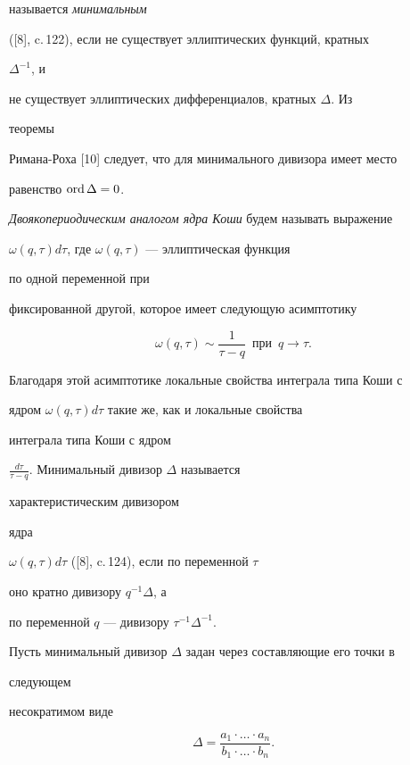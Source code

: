 называется {\it минимальным} 


([8], c.\,122), если не существует эллиптических функций, кратных 


$\Delta^{-1}$, и 


не существует эллиптических дифференциалов, кратных $\Delta$. Из 


теоремы 


Римана-Роха [10] следует, что для минимального дивизора имеет место 


равенство $\operatorname{ord}\Delta=0$. 


 


{\it Двоякопериодическим аналогом ядра Коши} будем называть выражение 


$\omega(q,\tau)d\tau$, где $\omega(q,\tau)$ --- эллиптическая функция 


по одной переменной при 


фиксированной другой, которое имеет следующую асимптотику 


\begin{equation} 


\omega(q,\tau)\sim\frac{1}{\tau-q}\ \;\text{при}\ \;q\to\tau. 


\end{equation} 


Благодаря этой асимптотике локальные свойства интеграла типа Коши с 


ядром $\omega(q,\tau)d\tau$ такие же, как и локальные свойства 


интеграла типа Коши с ядром 


$\frac{d\tau}{\tau-q}$. Минимальный дивизор $\Delta$ называется {\it 


характеристическим дивизором 


ядра} $\omega(q,\tau)d\tau$ ([8], c.\,124), если по переменной $\tau$ 


оно кратно дивизору $q^{-1}\Delta$, а 


по переменной $q$ --- дивизору $\tau^{-1}\Delta^{-1}$. 


 


Пусть минимальный дивизор $\Delta$ задан через составляющие его точки в 


следующем 


несократимом виде 


$$ 


\Delta=\frac{a_1\cdot\dotsc\cdot a_n}{b_1\cdot\dotsc\cdot b_n}. 


$$ 


